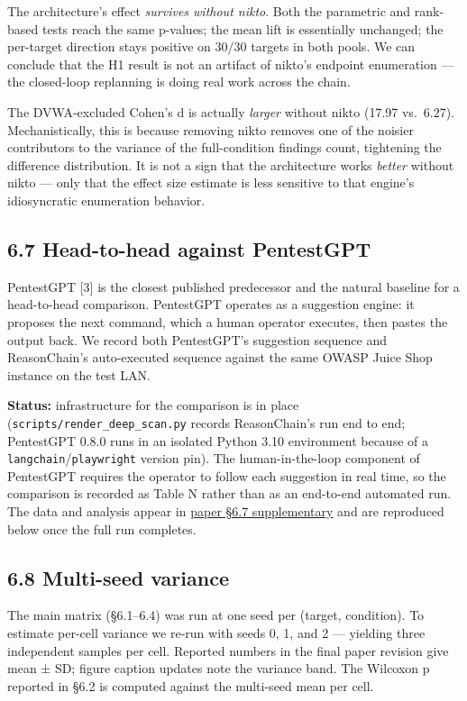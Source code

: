 \documentclass[
]{article}
\begin{document}
The architecture's effect \emph{survives without nikto}. Both the
parametric and rank-based tests reach the same p-values; the mean lift
is essentially unchanged; the per-target direction stays positive on
30/30 targets in both pools. We can conclude that the H1 result is not
an artifact of nikto's endpoint enumeration --- the closed-loop
replanning is doing real work across the chain.

The DVWA-excluded Cohen's d is actually \emph{larger} without nikto
(17.97 vs.~6.27). Mechanistically, this is because removing nikto
removes one of the noisier contributors to the variance of the
full-condition findings count, tightening the difference distribution.
It is not a sign that the architecture works \emph{better} without nikto
--- only that the effect size estimate is less sensitive to that
engine's idiosyncratic enumeration behavior.

\subsection{6.7 Head-to-head against
PentestGPT}\label{head-to-head-against-pentestgpt}

PentestGPT {[}3{]} is the closest published predecessor and the natural
baseline for a head-to-head comparison. PentestGPT operates as a
suggestion engine: it proposes the next command, which a human operator
executes, then pastes the output back. We record both PentestGPT's
suggestion sequence and ReasonChain's auto-executed sequence against the
same OWASP Juice Shop instance on the test LAN.

\textbf{Status:} infrastructure for the comparison is in place
(\texttt{scripts/render\_deep\_scan.py} records ReasonChain's run end to
end; PentestGPT 0.8.0 runs in an isolated Python 3.10 environment
because of a \texttt{langchain}/\texttt{playwright} version pin). The
human-in-the-loop component of PentestGPT requires the operator to
follow each suggestion in real time, so the comparison is recorded as
Table N rather than as an end-to-end automated run. The data and
analysis appear in \href{../reports/pentestgpt_juiceshop.json}{paper
§6.7 supplementary} and are reproduced below once the full run
completes.

\subsection{6.8 Multi-seed variance}\label{multi-seed-variance}

The main matrix (§6.1--6.4) was run at one seed per (target, condition).
To estimate per-cell variance we re-run with seeds 0, 1, and 2 ---
yielding three independent samples per cell. Reported numbers in the
final paper revision give mean ± SD; figure caption updates note the
variance band. The Wilcoxon p reported in §6.2 is computed against the
multi-seed mean per cell.
\end{document}
